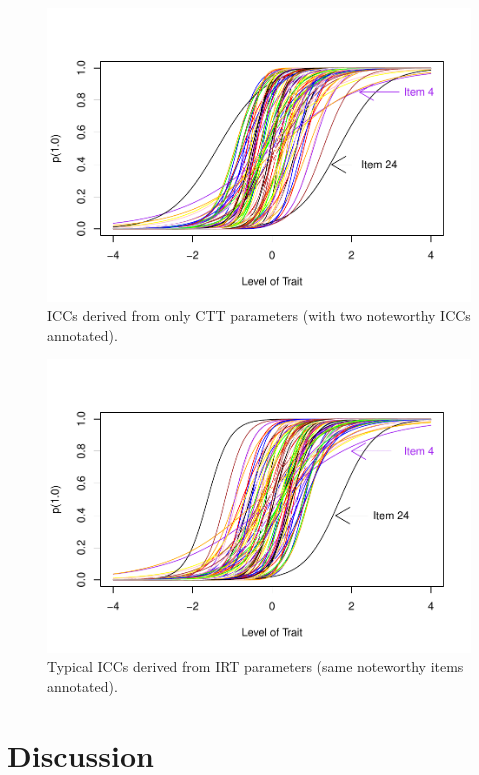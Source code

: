 \documentclass[
  man]{apa6}
\begin{document}
\begin{figure}
\centering
\includegraphics{ICC_project_files/figure-latex/cttcurves-1.pdf}
\caption{\label{fig:cttcurves}ICCs derived from only CTT parameters (with two noteworthy ICCs annotated).}
\end{figure}

\begin{figure}
\centering
\includegraphics{ICC_project_files/figure-latex/irtcurves-1.pdf}
\caption{\label{fig:irtcurves}Typical ICCs derived from IRT parameters (same noteworthy items annotated).}
\end{figure}

\hypertarget{discussion}{%
\section{Discussion}\label{discussion}}
\end{document}
